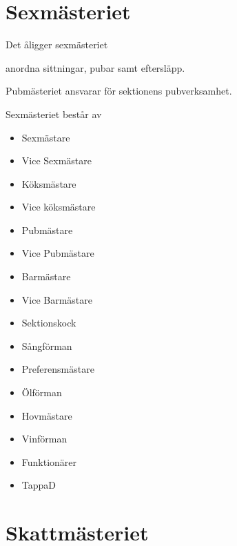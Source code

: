 \documentclass[pdfbookmarks,a4paper,11pt]{article}
\newlength{\itemcollength}
\newenvironment{reglemlista}{%
  \begin{list}{}{%
      \setlength{\labelwidth}{\itemcollength}%
      \setlength{\leftmargin}{\labelwidth + \labelsep}%
      \renewcommand{\makelabel}[1]{%
        \raisebox{0pt}[1ex][0pt]{%
          \makebox[\labelwidth][l]{%
            \parbox[t]{\itemcollength}{%
              \raggedright\hspace{0pt}##1}}}\hfill}%
      }}{%
  \end{list}}
\begin{document}
\section{Sexmästeriet}

\begin{reglemlista}

	\item[Åligganden]
	Det åligger sexmästeriet
	\begin{attlista}
		\item  anordna sittningar, pubar samt eftersläpp.
	\end{attlista}

	\item[Pubmästeriet]
	Pubmästeriet ansvarar för sektionens pubverksamhet.

	\item[Sammansättning]
	Sexmästeriet består av
	\begin{itemize}
		\item Sexmästare
		\item Vice Sexmästare
		\item Köksmästare
		\item Vice köksmästare
		\item Pubmästare
		\item Vice Pubmästare
		\item Barmästare
		\item Vice Barmästare
		\item Sektionskock
		\item Sångförman
		\item Preferensmästare
		\item Ölförman
		\item Hovmästare
		\item Vinförman
		\item Funktionärer
        \item TappaD
	\end{itemize}
\end{reglemlista}

\section{Skattmästeriet}
\end{document}
